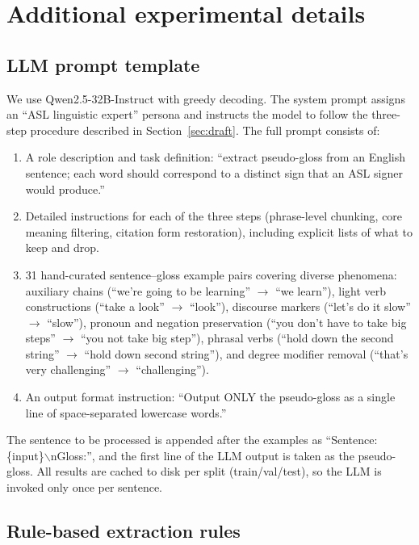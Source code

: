 \documentclass{article}
\begin{document}

\appendix

\section{Additional experimental details}
\label{app:details}

\subsection{LLM prompt template}
\label{app:llm_prompt}

We use Qwen2.5-32B-Instruct with greedy decoding.
The system prompt assigns an ``ASL linguistic expert'' persona and instructs the model to follow the three-step procedure described in Section~\ref{sec:draft}.
The full prompt consists of:
\begin{enumerate}
    \item A role description and task definition: ``extract pseudo-gloss from an English sentence; each word should correspond to a distinct sign that an ASL signer would produce.''
    \item Detailed instructions for each of the three steps (phrase-level chunking, core meaning filtering, citation form restoration), including explicit lists of what to keep and drop.
    \item 31 hand-curated sentence--gloss example pairs covering diverse phenomena: auxiliary chains (``we're going to be learning'' $\to$ ``we learn''), light verb constructions (``take a look'' $\to$ ``look''), discourse markers (``let's do it slow'' $\to$ ``slow''), pronoun and negation preservation (``you don't have to take big steps'' $\to$ ``you not take big step''), phrasal verbs (``hold down the second string'' $\to$ ``hold down second string''), and degree modifier removal (``that's very challenging'' $\to$ ``challenging'').
    \item An output format instruction: ``Output ONLY the pseudo-gloss as a single line of space-separated lowercase words.''
\end{enumerate}

The sentence to be processed is appended after the examples as ``Sentence: \{input\}$\backslash$nGloss:'', and the first line of the LLM output is taken as the pseudo-gloss.
All results are cached to disk per split (train/val/test), so the LLM is invoked only once per sentence.

\subsection{Rule-based extraction rules}
\label{app:rule_details}
\end{document}
